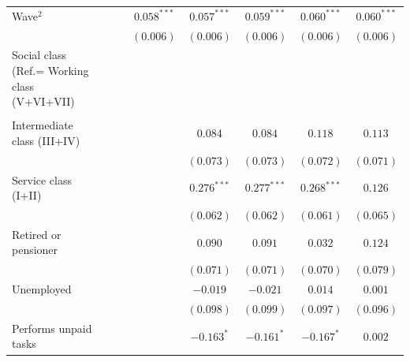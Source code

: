\documentclass[
  12pt,
]{article}
\begin{document}
\begin{table}
\begin{center}
{\begin{tabular}{l c c c c c c c}
Wave$^2$                                              &                &                & $0.058^{***}$  & $0.057^{***}$  & $0.059^{***}$  & $0.060^{***}$  & $0.060^{***}$  \\
                                                      &                &                & $(0.006)$      & $(0.006)$      & $(0.006)$      & $(0.006)$      & $(0.006)$      \\
Social class (Ref.= Working class (V+VI+VII)          &                &                &                &                &                &                &                \\
                                                      &                &                &                &                &                &                &                \\
\quad Intermediate class (III+IV)                     &                &                &                & $0.084$        & $0.084$        & $0.118$        & $0.113$        \\
                                                      &                &                &                & $(0.073)$      & $(0.073)$      & $(0.072)$      & $(0.071)$      \\
\quad Service class (I+II)                            &                &                &                & $0.276^{***}$  & $0.277^{***}$  & $0.268^{***}$  & $0.126$        \\
                                                      &                &                &                & $(0.062)$      & $(0.062)$      & $(0.061)$      & $(0.065)$      \\
\quad Retired or pensioner                            &                &                &                & $0.090$        & $0.091$        & $0.032$        & $0.124$        \\
                                                      &                &                &                & $(0.071)$      & $(0.071)$      & $(0.070)$      & $(0.079)$      \\
\quad Unemployed                                      &                &                &                & $-0.019$       & $-0.021$       & $0.014$        & $0.001$        \\
                                                      &                &                &                & $(0.098)$      & $(0.099)$      & $(0.097)$      & $(0.096)$      \\
\quad Performs unpaid tasks                           &                &                &                & $-0.163^{*}$   & $-0.161^{*}$   & $-0.167^{*}$   & $0.002$        \\

\end{tabular}}
\end{center}
\end{table}
\end{document}
